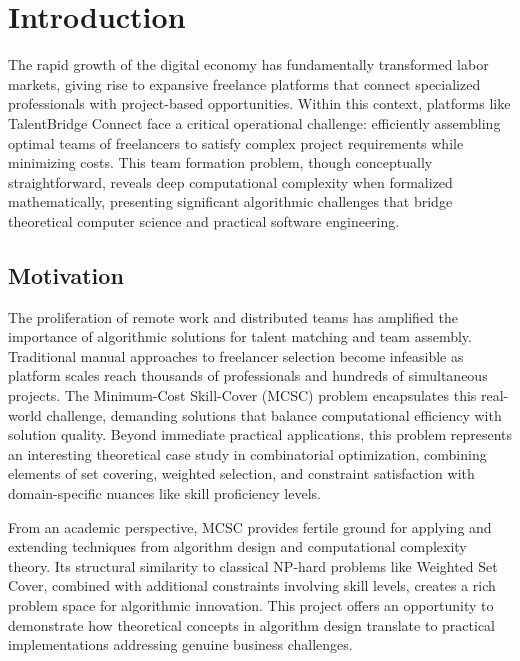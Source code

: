 \documentclass[12pt,a4paper]{article}
\begin{document}
	\tableofcontents
	
	\newpage
	
\section{Introduction}
\label{sec:introduction}

The rapid growth of the digital economy has fundamentally transformed labor markets, giving rise to expansive freelance platforms that connect specialized professionals with project-based opportunities. Within this context, platforms like TalentBridge Connect face a critical operational challenge: efficiently assembling optimal teams of freelancers to satisfy complex project requirements while minimizing costs. This team formation problem, though conceptually straightforward, reveals deep computational complexity when formalized mathematically, presenting significant algorithmic challenges that bridge theoretical computer science and practical software engineering.

\subsection{Motivation}
\label{subsec:motivation}

The proliferation of remote work and distributed teams has amplified the importance of algorithmic solutions for talent matching and team assembly. Traditional manual approaches to freelancer selection become infeasible as platform scales reach thousands of professionals and hundreds of simultaneous projects. The Minimum-Cost Skill-Cover (MCSC) problem encapsulates this real-world challenge, demanding solutions that balance computational efficiency with solution quality. Beyond immediate practical applications, this problem represents an interesting theoretical case study in combinatorial optimization, combining elements of set covering, weighted selection, and constraint satisfaction with domain-specific nuances like skill proficiency levels.

From an academic perspective, MCSC provides fertile ground for applying and extending techniques from algorithm design and computational complexity theory. Its structural similarity to classical NP-hard problems like Weighted Set Cover, combined with additional constraints involving skill levels, creates a rich problem space for algorithmic innovation. This project offers an opportunity to demonstrate how theoretical concepts in algorithm design translate to practical implementations addressing genuine business challenges.
\end{document}
